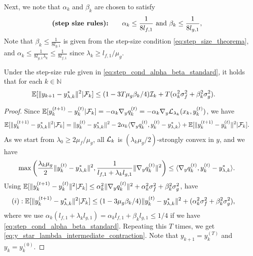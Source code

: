 Next, we note that $\alpha_k$ and $\beta_k$ are chosen to satisfy  
\begin{align}
    \textbf{(step size rules):} \qquad \alpha_k \le \frac{1}{8 l_{f,1}} \hbox{ and } \beta_k \le \frac{1}{8 l_{g,1}}, \label{eq:step_cond_alpha_beta_standard}
\end{align}
Note that $\beta_k \le \frac{1}{8l_{g,1}}$ is given from the step-size condition \eqref{eq:step_size_theorema}, and $\alpha_k \le \frac{1}{8 l_{g,1} \lambda_k} \le \frac{1}{8 l_{f,1}}$ since $\lambda_k \ge l_{f,1} / \mu_g$. 



\begin{lemma}
\label{lem:gen20}
Under the step-size rule given in \eqref{eq:step_cond_alpha_beta_standard}, it holds that for each $k \in \mathbb{N}$
\begin{align}
    \mathbb{E}[\|y_{k+1} - y_{\lambda,k}^*\|^2 | \mathcal{F}_k] &\le (1 - 3 T \mu_g \beta_k / 4) \mathcal{I}_k + T (\alpha_k^2 \sigma_f^2 + \beta_k^2 \sigma_g^2). \label{eq:y_star_lambda_intermediate_contraction}
\end{align}
\end{lemma}

\begin{proof}
Since $\mathbb{E}[y_{k}^{(t+1)} - y_k^{(t)} | \mathcal{F}_k] = - \alpha_k \nabla_y q_k^{(t)} = - \alpha_k \nabla_y \mathcal{L}_{\lambda_k} (x_k, y_k^{(t)})$, we have
\begin{align*}
    \mathbb{E}[\|y_{k}^{(t+1)} - y_{\lambda, k}^*\|^2| \mathcal{F}_k] = \|y_{k}^{(t)} - y_{\lambda, k}^*\|^2 - 2\alpha_k \langle \nabla_y q_k^{(t)}, y_{k}^{(t)} - y_{\lambda, k}^* \rangle + \mathbb{E}[\|y_{k}^{(t+1)} - y_k^{(t)}\|^2| \mathcal{F}_k]. 
\end{align*}
As we start from $\lambda_0 \ge 2\mu_f / \mu_g$, all $\mathcal{L}_k$ is $(\lambda_k\mu_g/2)$-strongly convex in $y$, and we have
\begin{align*}
    \max \left( \frac{\lambda_k \mu_g }{2} \|y_k^{(t)} - y_{\lambda,k}^*\|^2 , \frac{1}{l_{f,1} + \lambda_k l_{g,1}} \|\nabla_y q_k^{(t)}\|^2 \right) \le \langle \nabla_y q_k^{(t)}, y_k^{(t)} - y_{\lambda, k}^* \rangle. 
\end{align*}
Using $\mathbb{E}[\|y_{k}^{(t+1)} - y_k^{(t)}\|^2|\mathcal{F}_k] \le \alpha_k^2 \|\nabla_y q_k^{(t)} \|^2 + \alpha_k^2 \sigma_f^2 + \beta_k^2 \sigma_g^2$, have
\begin{align*}
    (i): \mathbb{E}[\|y_{k}^{(t+1)} - y_{\lambda, k}^*\|^2|\mathcal{F}_k] &\le (1 - 3 \mu_g \beta_k / 4) \|y_k^{(t)} - y_{\lambda, k}^*\|^2 + (\alpha_k^2 \sigma_f^2 + \beta_k^2 \sigma_g^2), 
\end{align*}
where we use $\alpha_k (l_{f,1} + \lambda_k l_{g,1}) = \alpha_k l_{f,1} + \beta_k l_{g,1} \le 1/4$ if we have \eqref{eq:step_cond_alpha_beta_standard}.
Repeating this $T$ times, we get \eqref{eq:y_star_lambda_intermediate_contraction}. Note that $y_{k+1} = y_{k}^{(T)}$ and $y_{k} = y_{k}^{(0)}$.
\end{proof}







